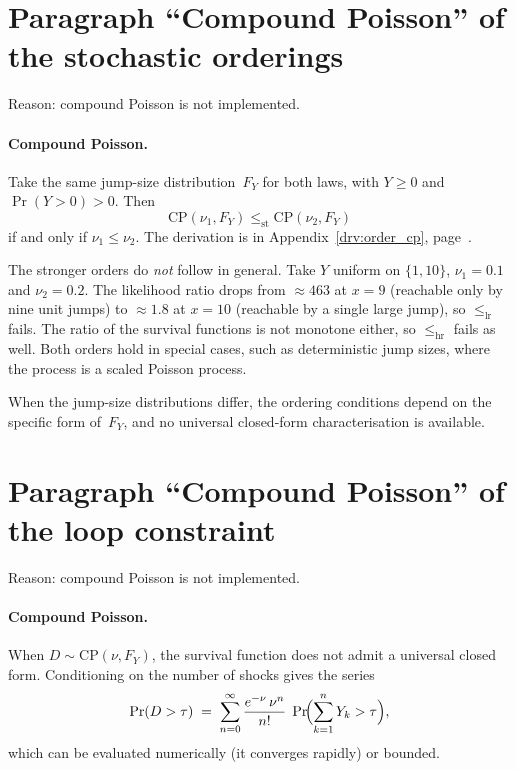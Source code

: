 \documentclass[11pt,a4paper]{article}
\theoremstyle{plain}
\theoremstyle{definition}
\theoremstyle{remark}
\begin{document}
\section{Paragraph ``Compound Poisson'' of the stochastic orderings}

Reason: compound Poisson is not implemented.

\paragraph{Compound Poisson.}
Take the same jump-size distribution~$F_Y$ for both laws, with $Y \ge 0$ and $\Pr(Y>0) > 0$.
Then
\begin{equation}
  \mathrm{CP}(\nu_1, F_Y) \le_{\mathrm{st}} \mathrm{CP}(\nu_2, F_Y)
\end{equation}
if and only if $\nu_1 \le \nu_2$.
The derivation is in Appendix~\ref{drv:order_cp}, page~\pageref{drv:order_cp}.

The stronger orders do \emph{not} follow in general.
Take $Y$ uniform on $\{1, 10\}$, $\nu_1 = 0.1$ and $\nu_2 = 0.2$.
The likelihood ratio drops from ${\approx}463$ at $x = 9$ (reachable only by nine unit jumps) to ${\approx}1.8$ at $x = 10$ (reachable by a single large jump), so $\le_{\mathrm{lr}}$ fails.
The ratio of the survival functions is not monotone either, so $\le_{\mathrm{hr}}$ fails as well.
Both orders hold in special cases, such as deterministic jump sizes, where the process is a scaled Poisson process.

When the jump-size distributions differ, the ordering conditions depend on the specific form of~$F_Y$, and no universal closed-form characterisation is available.

\section{Paragraph ``Compound Poisson'' of the loop constraint}

Reason: compound Poisson is not implemented.

\paragraph{Compound Poisson.}
When $D \sim \mathrm{CP}(\nu,F_Y)$, the survival function does not admit a universal closed form.
Conditioning on the number of shocks gives the series
\begin{equation}\label{eq:surv_cp}
  \Pr(D > \tau) \;=\; \sum_{n=0}^{\infty} \frac{e^{-\nu}\,\nu^n}{n!}\;\Pr\!\Bigl(\sum_{k=1}^{n} Y_k > \tau\Bigr),
\end{equation}
which can be evaluated numerically (it converges rapidly) or bounded.
\end{document}
